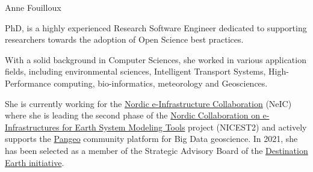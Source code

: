 \begin{participant}[gender=female]{Anne Fouilloux}






  \medskip PhD, is a highly experienced Research Software Engineer dedicated to supporting
  researchers towards the adoption of Open Science best practices.

  With a solid background in Computer Sciences, she worked in various application fields, including environmental sciences, Intelligent Transport Systems, High-Performance computing, bio-informatics, meteorology and Geosciences.

  She is currently working for the \href{https://neic.no}{Nordic e-Infrastructure Collaboration} (NeIC) where she is leading the second phase of the \href{https://neic.no/nicest2/}{Nordic Collaboration on e-Infrastructures for Earth System Modeling Tools} project (NICEST2) and actively supports the \href{https://pangeo.io/}{Pangeo} community platform for Big Data geoscience. In 2021, she has been selected as a member of the Strategic Advisory Board of the \href{https://stories.ecmwf.int/destination-earth/index.html}{Destination Earth initiative}. 


\end{participant}
